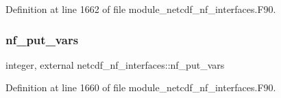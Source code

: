 Definition at line 1662 of file module\+\_\+netcdf\+\_\+nf\+\_\+interfaces.\+F90.

\mbox{\label{namespacenetcdf__nf__interfaces_a6a8028b7b7144de9fe3c5483ada5215f}} 
\subsubsection{\texorpdfstring{nf\+\_\+put\+\_\+vars}{nf\_put\_vars}}
{\footnotesize\ttfamily integer, external netcdf\+\_\+nf\+\_\+interfaces\+::nf\+\_\+put\+\_\+vars}



Definition at line 1660 of file module\+\_\+netcdf\+\_\+nf\+\_\+interfaces.\+F90.

